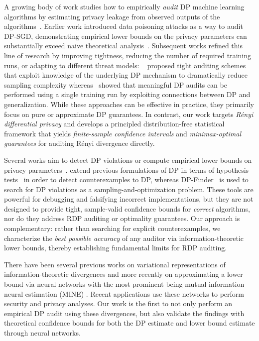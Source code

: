 \documentclass{article}
\theoremstyle{plain}
\theoremstyle{definition}
\theoremstyle{remark}
\begin{document}
A growing body of work studies how to empirically \emph{audit} DP machine learning
algorithms by estimating privacy leakage from observed outputs of the algorithms~\citep{ShokriSSS17,AD24,muthu2024nearly,DingWWZK18,GuanFHY23,YMMBS22,KMRS24}.
Earlier work introduced data poisoning attacks as a way to audit DP-SGD, demonstrating empirical lower bounds on
the privacy parameters can substantially exceed naive theoretical analysis~\citep{jagielski2020auditing}.
Subsequent works refined this line of research by improving tightness, reducing the number of required
training runs, or adapting to
different threat models:
~\cite{nasr2023tight} proposed tight auditing schemes that exploit knowledge of the underlying
DP mechanism to dramatically reduce sampling complexity whereas~\cite{steinke2023privacy, mahloujifar2024auditing}  showed that
meaningful DP audits can be performed using a single training run by exploiting connections between DP and
generalization. While these approaches can be effective in practice, they primarily focus on
pure or approximate DP guarantees. In contrast, our work targets
\emph{R\'enyi differential privacy} and develops a principled distribution-free statistical framework that
yields \emph{finite-sample confidence intervals} and
\emph{minimax-optimal guarantees} for auditing R\'enyi divergence directly.

Several works aim to detect DP violations or compute empirical lower bounds on privacy parameters~\citep{DingWWZK18,GuanFHY23,YMMBS22}.
\cite{DingWWZK18} extend previous formulations of DP in terms of hypothesis tests~\citep{kairouz2016extremal,kairouz2015composition} in order to detect counterexamples to DP, whereas
DP-Finder~\citep{BichselGDTV18} is used to search for DP violations as a sampling-and-optimization problem.
These tools are powerful for debugging and falsifying incorrect implementations, but they are not
designed to provide tight, sample-valid confidence bounds for \emph{correct} algorithms, nor do they address RDP
auditing or optimality guarantees.
Our approach is complementary: rather than searching for explicit counterexamples, we characterize the
\emph{best possible accuracy} of any auditor via information-theoretic lower bounds, thereby establishing
fundamental limits for RDP auditing.

There have been several previous works on variational representations of information-theoretic divergences \cite{donsker1983asymptotic, anantharam2018variational} and more recently on approximating a lower bound via neural networks with the most prominent being mutual information neural estimation (MINE) \cite{belghazi2018mine}. Recent applications \cite{esfahanizadeh2023infoshape,kim2024crypto, kim2025cryptanalysis} use these networks to perform security and privacy analyses. Our work is the first to not only perform an empirical DP audit using these divergences, but also validate the findings with theoretical confidence bounds for both the DP estimate and lower bound estimate through neural networks.
\end{document}
